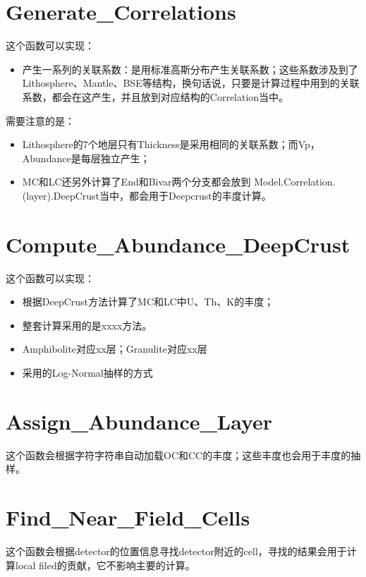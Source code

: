 	\section{Generate\_Correlations}
		这个函数可以实现：
			\begin{itemize}
				\item 产生一系列的关联系数：是用标准高斯分布产生关联系数；这些系数涉及到了Lithosphere、Mantle、BSE等结构，换句话说，只要是计算过程中用到的关联系数，都会在这产生，并且放到对应结构的Correlation当中。
			\end{itemize}
		需要注意的是：
			\begin{itemize}
				\item Lithosphere的7个地层只有Thickness是采用相同的关联系数；而Vp，Abundance是每层独立产生；
				\item MC和LC还另外计算了End和Bivar两个分支都会放到 Model.Correlation.(layer).DeepCrust当中，都会用于Deepcrust的丰度计算。
			\end{itemize}
	\section{Compute\_Abundance\_DeepCrust}
		这个函数可以实现：
			\begin{itemize}
				\item 根据DeepCrust方法计算了MC和LC中U、Th、K的丰度；
				\item 整套计算采用的是xxxx方法。
				\item Amphibolite对应xx层；Granulite对应xx层
				\item 采用的Log-Normal抽样的方式
			\end{itemize}
	\section{Assign\_Abundance\_Layer}
		这个函数会根据字符字符串自动加载OC和CC的丰度；这些丰度也会用于丰度的抽样。
	\section{Find\_Near\_Field\_Cells}
		这个函数会根据detector的位置信息寻找detector附近的cell，寻找的结果会用于计算local filed的贡献，它不影响主要的计算。
